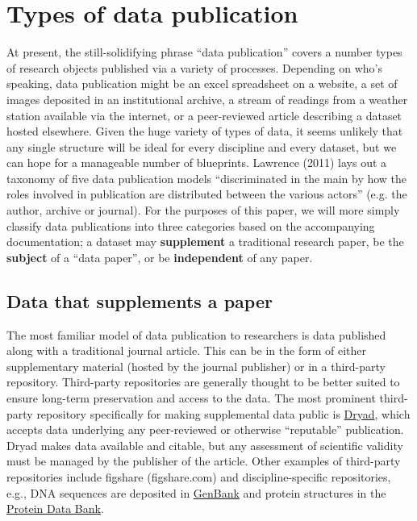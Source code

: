 \documentclass[10pt,a4paper,twocolumn]{article}
\begin{document}
\section*{Types of data publication}\label{types-of-data-publication}

At present, the still-solidifying phrase ``data publication'' covers a number types of research objects published via a variety of processes.
Depending on who's speaking,  data publication might be an excel spreadsheet on a website, a set of images deposited in an institutional archive, a stream of readings from a weather station available via the internet, or a peer-reviewed article describing a dataset hosted elsewhere.
Given the huge variety of types of data, it seems unlikely that any single structure will be ideal for every discipline and every dataset, but we can hope for a manageable number of blueprints. 
Lawrence (2011) lays out a taxonomy of five data publication models ``discriminated in the main by how the roles involved in publication are distributed between the various actors'' (e.g. the author, archive or journal).\cite{lawrence_data_2011} 
For the purposes of this paper, we will more simply classify data publications into three categories based on the accompanying documentation; a dataset may \textbf{supplement} a traditional research paper, be the \textbf{subject} of a ``data paper'', or be \textbf{independent} of any paper.


\subsection*{Data that supplements a paper}\label{paper-supplement-data}

The most familiar model of data publication to researchers is data published along with a traditional journal article. This can be in the form of either supplementary material (hosted by the journal publisher) or in a third-party repository. 
Third-party repositories are generally thought to be better suited to ensure long-term preservation and access to the data.
The most prominent third-party repository specifically for making supplemental data public is \href{http://www.datadryad.org/}{Dryad}, which accepts data underlying any peer-reviewed or otherwise ``reputable'' publication. 
Dryad makes data available and citable, but any assessment of scientific validity must be managed by the publisher of the article. Other examples of third-party repositories include figshare (figshare.com) and discipline-specific repositories, e.g., DNA sequences are deposited in \href{http://www.ncbi.nlm.nih.gov/genbank/}{GenBank}\cite{benson_genbank_2013} and protein structures in the \href{http://www.rcsb.org/}{Protein Data Bank}\cite{berman_the_2000}.
\end{document}
